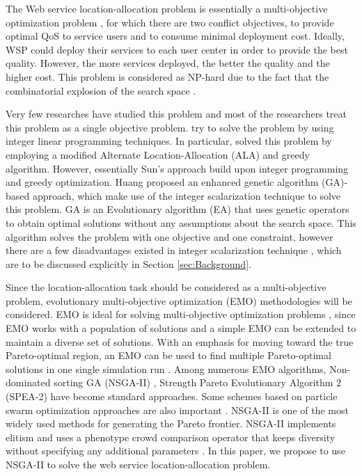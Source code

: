 \documentclass{llncs}
\begin{document}
The Web service location-allocation problem is essentially a multi-objective optimization problem \cite{Multiobjective}, for which there are two conflict objectives, to provide optimal 
QoS to service users and to consume minimal deployment cost.
Ideally, WSP could deploy their services to each user center in order to provide the best quality.
However, the more services deployed, the better the quality and the higher cost. 
This problem is considered as NP-hard due to the fact that the combinatorial explosion of the search space \cite{Vanrompay}. 


Very few researches have studied this problem and most of the researchers treat this problem as a single objective problem.
\cite{Aboolian} \cite{Sun} try to solve the problem by using integer linear programming techniques.
In particular, \cite{Sun} solved this problem by employing a modified Alternate Location-Allocation (ALA) and greedy algorithm. 
However, essentially Sun's approach build upon integer programming and greedy optimization. 
Huang \cite{EnhancedGenetic} proposed an enhanced genetic algorithm (GA)-based approach, which make use of the integer scalarization technique to solve this problem.
GA \cite{man1996genetic} is an Evolutionary algorithm (EA) that uses genetic operators to obtain optimal solutions without any assumptions about the search space.
This algorithm solves the problem with one objective and one constraint, however there are a few disadvantages existed in
integer scalarization technique \cite{Multiobjective}, which are to be discussed explicitly in Section \ref{sec:Background}.

Since the location-allocation task should be considered as a multi-objective problem, evolutionary multi-objective optimization (EMO) methodologies will be considered.
EMO is ideal for solving multi-objective optimization problems \cite{key:article}, since EMO works with a population of solutions and 
a simple EMO can be extended to maintain a diverse set of solutions.
With an emphasis for moving toward the true Pareto-optimal region, an EMO can be used to find multiple Pareto-optimal solutions in 
one single simulation run \cite{OptimizationElectrical}. Among numerous EMO algorithms,
Non-dominated sorting GA (NSGA-II) \cite{996017}, Strength Pareto Evolutionary Algorithm 2 (SPEA-2) \cite{Deb} have become standard approaches. 
Some schemes based on particle swarm optimization approaches are also important \cite{Elhossini} \cite{Huang}.
NSGA-II is one of the most widely used methods for generating the Pareto frontier. 
NSGA-II implements elitism and uses a phenotype crowd comparison operator that keeps diversity without specifying any additional parameters \cite{Deb06referencepoint}.
In this paper, we propose to use NSGA-II to solve the web service location-allocation problem.
\end{document}
